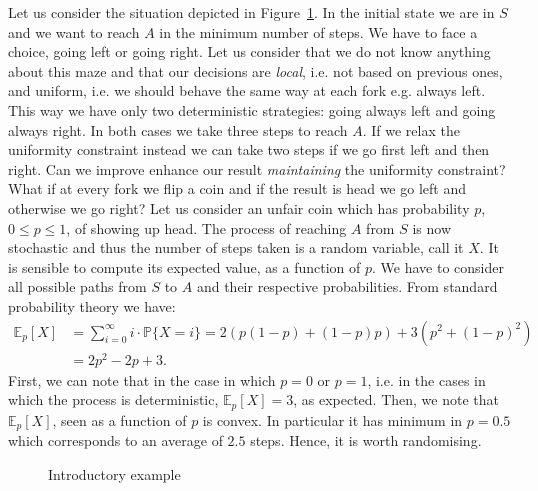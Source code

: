 \begin{example}
	Let us consider the situation depicted in Figure~\ref{figure:intro}. In the initial state we are in $S$ and we want to reach $A$ in the minimum number of steps. We have to face a choice, going left or going right. Let us consider that we do not know anything about this maze and that our decisions are \emph{local}, i.e. not based on previous ones, and uniform, i.e. we should behave the same way at each fork e.g. always left. This way we have only two deterministic strategies: going always left and going always right. In both cases we take three steps to reach $A$. If we relax the uniformity constraint instead we can take two steps if we go first left and then right. Can we improve enhance our result \emph{maintaining} the uniformity constraint? What if at every fork we flip a coin and if the result is head we go left and otherwise we go right? Let us consider an unfair coin which has probability $p$, $0\leq p\leq 1$, of showing up head. The process of reaching $A$ from $S$ is now stochastic and thus the number of steps taken is a random variable, call it $X$. It is sensible to compute its expected value, as a function of $p$. We have to consider all possible paths from $S$ to $A$ and their respective probabilities. From standard probability theory we have:
	\begin{align*}
	\mathbb{E}_p[X]&=\sum\limits_{i=0}^{\infty} i\cdot\mathbb{P}\{X=i\}=2(p(1-p)+ (1-p)p)+3(p^2+(1-p)^2)\\
	&=2p^2-2p+3.
	\end{align*}
	First, we can note that in the case in which $p=0$ or $p=1$, i.e. in the cases in which the process is deterministic, $\mathbb{E}_p[X]=3$, as expected. Then, we note that $\mathbb{E}_p[X]$, seen as a function of $p$ is convex. In particular it has minimum in $p=0.5$ which corresponds to an average of $2.5$ steps. Hence, it is worth randomising.
\end{example}
\begin{figure}
	\caption{Introductory example}
	\label{figure:intro}
\end{figure}
